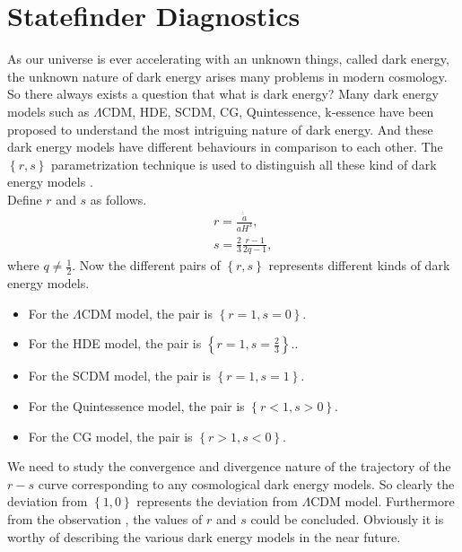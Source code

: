 \documentclass[showpacs,aps,amssymb,preprintnumbers,prd,amsmath,floatfix]{revtex4}
\def \ben{\begin{eqnarray}}
\def \een{\end{eqnarray}}
\begin{document}
\section{Statefinder Diagnostics}\label{IX}
As our universe is ever accelerating with an unknown things, called dark energy, the unknown nature of dark energy arises many problems in modern cosmology. So there always exists a question that what is dark energy? Many dark energy models such as $\Lambda$CDM, HDE, SCDM, CG, Quintessence, k-essence have been proposed to understand the most intriguing nature of dark energy. And these dark energy models have different behaviours in comparison to each other. The $\left\lbrace r,s\right\rbrace$ parametrization technique is used to distinguish all these kind of dark energy models \cite{Sahni,Alam}.\\
Define $r$ and $s$ as follows.
\ben
&&r=\frac{\dot{\ddot{a}}}{aH^3},\label{52}
\\
&&s=\frac{2}{3}\frac{r-1}{2q-1},\label{53}
\een
where $q\neq \frac{1}{2}$. Now the different pairs of $\left\lbrace r,s\right\rbrace$ represents different kinds of dark energy models.

\begin{itemize}
\item[(a).] For the $\Lambda$CDM model, the pair is $\left\lbrace r=1,s=0\right\rbrace$.

\item[(b).] For the HDE model, the pair is $\left\lbrace r=1,s=\frac{2}{3}\right\rbrace$..

\item[(c).] For the SCDM model, the pair is $\left\lbrace r=1,s=1\right\rbrace$. 

\item[(d).] For the Quintessence model, the pair is $\left\lbrace r<1,s>0\right\rbrace$.

\item[(e).] For the CG model, the pair is $\left\lbrace r>1,s<0\right\rbrace$. 
\end{itemize}

We need to study the convergence and divergence nature of the trajectory of the $r-s$ curve corresponding to any cosmological dark energy models. So clearly the deviation from $\left\lbrace 1,0 \right\rbrace$ represents the deviation from $\Lambda$CDM model. Furthermore from the observation \cite{Albert,Albert2}, the values of $r$ and $s$ could be concluded. Obviously it is worthy of describing the various dark energy models in the near future.
\end{document}
